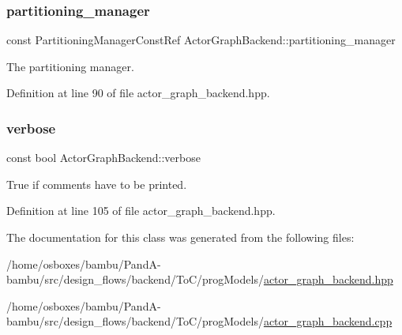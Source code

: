 \subsubsection{\texorpdfstring{partitioning\+\_\+manager}{partitioning\_manager}}
{\footnotesize\ttfamily const Partitioning\+Manager\+Const\+Ref Actor\+Graph\+Backend\+::partitioning\+\_\+manager\hspace{0.3cm}{\ttfamily [protected]}}



The partitioning manager. 



Definition at line 90 of file actor\+\_\+graph\+\_\+backend.\+hpp.

\mbox{\label{classActorGraphBackend_afd77c9f5660886e118b6af2b4be03328}} 
\subsubsection{\texorpdfstring{verbose}{verbose}}
{\footnotesize\ttfamily const bool Actor\+Graph\+Backend\+::verbose\hspace{0.3cm}{\ttfamily [protected]}}



True if comments have to be printed. 



Definition at line 105 of file actor\+\_\+graph\+\_\+backend.\+hpp.



The documentation for this class was generated from the following files\+:\begin{DoxyCompactItemize}
\item 
/home/osboxes/bambu/\+Pand\+A-\/bambu/src/design\+\_\+flows/backend/\+To\+C/prog\+Models/\hyperlink{actor__graph__backend_8hpp}{actor\+\_\+graph\+\_\+backend.\+hpp}\item 
/home/osboxes/bambu/\+Pand\+A-\/bambu/src/design\+\_\+flows/backend/\+To\+C/prog\+Models/\hyperlink{actor__graph__backend_8cpp}{actor\+\_\+graph\+\_\+backend.\+cpp}\end{DoxyCompactItemize}
